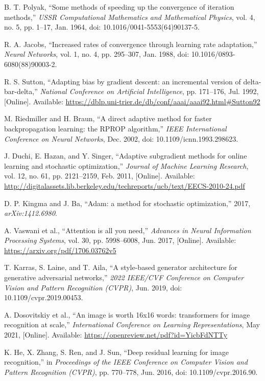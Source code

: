 \documentclass[conference]{IEEEtran}
\begin{document}
\begin{thebibliography}{00}
B. T. Polyak, ``Some methods of speeding up the convergence of iteration methods,'' \textit{USSR Computational Mathematics and Mathematical Physics}, vol. 4, no. 5, pp. 1--17, Jan. 1964, doi: 10.1016/0041-5553(64)90137-5.

R. A. Jacobs, ``Increased rates of convergence through learning rate adaptation,'' \textit{Neural Networks}, vol. 1, no. 4, pp. 295--307, Jan. 1988, doi: 10.1016/0893-6080(88)90003-2.

R. S. Sutton, ``Adapting bias by gradient descent: an incremental version of delta-bar-delta,'' \textit{National Conference on Artificial Intelligence}, pp. 171--176, Jul. 1992, [Online]. Available: \url{https://dblp.uni-trier.de/db/conf/aaai/aaai92.html#Sutton92}

M. Riedmiller and H. Braun, ``A direct adaptive method for faster backpropagation learning: the RPROP algorithm,'' \textit{IEEE International Conference on Neural Networks}, Dec. 2002, doi: 10.1109/icnn.1993.298623.

J. Duchi, E. Hazan, and Y. Singer, ``Adaptive subgradient methods for online learning and stochastic optimization,'' \textit{Journal of Machine Learning Research}, vol. 12, no. 61, pp. 2121--2159, Feb. 2011, [Online]. Available: \url{http://digitalassets.lib.berkeley.edu/techreports/ucb/text/EECS-2010-24.pdf}

D. P. Kingma and J. Ba, ``Adam: a method for stochastic optimization,'' 2017, \textit{arXiv:1412.6980}.

A. Vaswani et al., ``Attention is all you need,'' \textit{Advances in Neural Information Processing Systems}, vol. 30, pp. 5998--6008, Jun. 2017, [Online]. Available: \url{https://arxiv.org/pdf/1706.03762v5}

T. Karras, S. Laine, and T. Aila, ``A style-based generator architecture for generative adversarial networks,'' \textit{2022 IEEE/CVF Conference on Computer Vision and Pattern Recognition (CVPR)}, Jun. 2019, doi: 10.1109/cvpr.2019.00453.

A. Dosovitskiy et al., ``An image is worth 16x16 words: transformers for image recognition at scale,'' \textit{International Conference on Learning Representations}, May 2021, [Online]. Available: \url{https://openreview.net/pdf?id=YicbFdNTTy}

K. He, X. Zhang, S. Ren, and J. Sun, ``Deep residual learning for image recognition,'' in \textit{Proceedings of the IEEE Conference on Computer Vision and Pattern Recognition (CVPR)}, pp. 770--778, Jun. 2016, doi: 10.1109/cvpr.2016.90.


\end{thebibliography}
\end{document}
